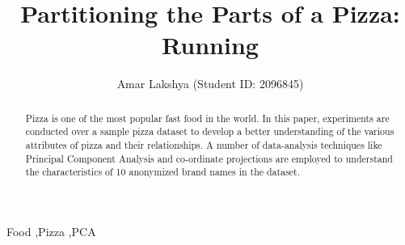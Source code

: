 \documentclass[preprint,12pt]{elsarticle}
\begin{document}
\begin{frontmatter}



\title{Partitioning the Parts of a Pizza: Running}


\author{Amar Lakshya (Student ID: 2096845)}

\address{School of Computer Science, University of Birmingham}

\begin{abstract}
Pizza is one of the most popular fast food in the world. In this paper, experiments are conducted over a sample pizza dataset
to develop a better understanding of the various attributes of pizza and their relationships. A number of data-analysis techniques
like Principal Component Analysis and co-ordinate projections are employed to understand the characteristics of  10 anonymized 
brand names in the dataset.
\end{abstract}

\begin{keyword}
Food \sep Pizza \sep PCA

\end{keyword}

\end{frontmatter}


\end{document}
